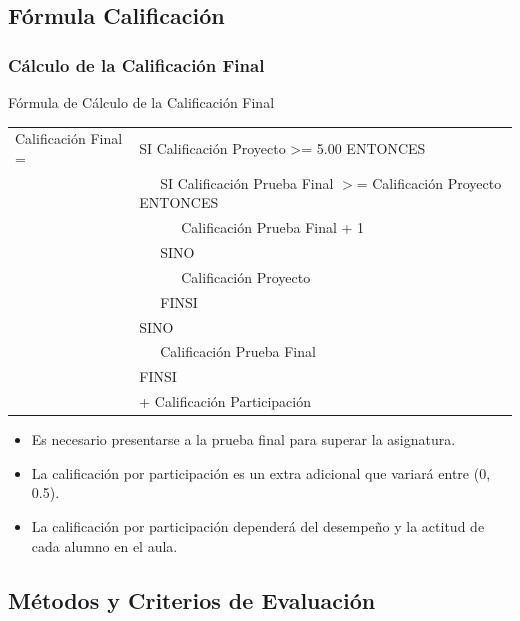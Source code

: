 \documentclass[handout,a4paper,slidestop,xcolor=pst,dvips,blue]{beamer}
\begin{document}
\subsection{Fórmula Calificación}

\begin{frame}[c]
	\frametitle{Cálculo de la Calificación Final}
	\begin{block}{Fórmula de Cálculo de la Calificación Final}
		\begin{scriptsize}
        \begin{tabular}{ll}
			Calificación Final = & SI Calificación Proyecto >= 5.00 ENTONCES \\
                                 & \ \ \ SI Calificación Prueba Final  $>$= Calificación Proyecto ENTONCES \\
                                 & \ \ \ \ \ \ Calificación Prueba Final + 1  \\
                                 & \ \ \ SINO \\
                                 & \ \ \ \ \ \ Calificación Proyecto \\
                                 & \ \ \ FINSI \\
                                 & SINO \\
                                 & \ \ \  Calificación Prueba Final \\
                                 & FINSI \\
                                 & + Calificación Participación
		\end{tabular}
        \end{scriptsize}
	\end{block}
	\begin{itemize}
		\item<2-> Es necesario presentarse a la prueba final para superar la asignatura.
        \item<4-> La calificación por participación es un extra adicional que variará entre (0, 0.5).
        \item<5-> La calificación por participación dependerá del desempeño y la actitud de cada alumno en el aula.
	\end{itemize}
\end{frame}

\subsection{Métodos y Criterios de Evaluación}
\end{document}
